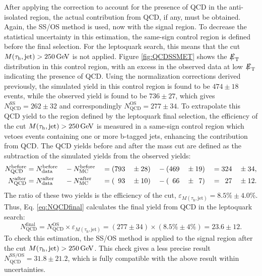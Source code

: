 \documentclass[12pt]{thesis}  %
\newcommand{\tauh}{\ensuremath{\tau_{\text{h}}}\xspace}
\def\eslash{\ensuremath{{\hbox{$E$\kern-0.6em\lower-.05ex\hbox{/}\kern0.10em}}}}
\def\met{\mbox{$\eslash_\text{T}$}\xspace} %
\def\MassTJ{\ensuremath{M(\tauh,\text{jet})}\xspace}
\begin{document}
After applying the correction to account for the presence of QCD in the anti-isolated region, the actual contribution from QCD, if any, must be obtained. Again, the SS/OS method is used, now with the signal region. To decrease the statistical uncertainty in this estimation, the same-sign control region is defined before the final selection. For the leptoquark search, this means that the cut $\MassTJ>250\GeV$ is not applied. Figure \ref{fig:QCDSSMET} shows the \met distribution in this control region, with an excess in the observed data at low \met indicating the presence of QCD. Using the normalization corrections derived previously, the simulated yield in this control region is found to be $474\pm18$ events, while the observed yield is found to be $736\pm27$, which gives $N_{\text{QCD}}^{\text{SS}} = 262\pm32$ and correspondingly $N_{\text{QCD}}^{\text{OS}} = 277\pm34$. To extrapolate this QCD yield to the region defined by the leptoquark final selection, the efficiency of the cut $\MassTJ>250\GeV$ is measured in a same-sign control region which vetoes events containing one or more b-tagged jets, enhancing the contribution from QCD. The QCD yields before and after the mass cut are defined as the subtraction of the simulated yields from the observed yields:
\begin{alignat}{8}
N_{\text{QCD}}^{\text{before}} &= N_{\text{data}}^{\text{before}} &&- N_{\text{MC}}^{\text{before}} &&= (793 &&\pm 28) &&- (469 &&\pm 19) &&= 324 &&\pm 34, \\
N_{\text{QCD}}^{\text{after}} &= N_{\text{data}}^{\text{after}}   &&- N_{\text{MC}}^{\text{after}}  &&= (\hphantom{7}93  &&\pm 10) &&- (\hphantom{4}66  &&\pm \hphantom{1}7)  &&= \hphantom{3}27  &&\pm 12.
\end{alignat}
The ratio of these two yields is the efficiency of the cut, $\varepsilon_{\MassTJ}=8.5\%\pm4.0\%$. Thus, Eq. \eqref{eq:NQCDfinal} calculates the final yield from QCD in the leptoquark search:
\begin{equation}
N_{\text{QCD}}^{\text{final}} = N_{\text{QCD}}^{\text{OS}} \times \varepsilon_{\MassTJ} = (277\pm 34) \times (8.5\% \pm 4\%) = 23.6 \pm 12. \label{eq:NQCDfinal}
\end{equation}
To check this estimation, the SS/OS method is applied to the signal region after the cut $\MassTJ>250\GeV$. This check gives a less precise result $N_{\text{QCD}}^{\text{SS/OS}} = 31.8 \pm 21.2$, which is fully compatible with the above result within uncertainties.
\end{document}
